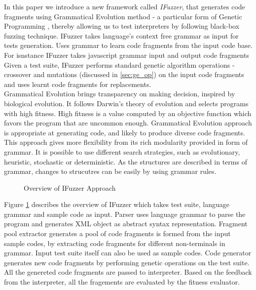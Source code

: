 \documentclass{acm_proc_article-sp}
\begin{document}
\indent In this paper we introduce a new framework called \textit{IFuzzer}, that generates code fragments using Grammatical Evolution method - a particular form of Genetic Programming \cite{Neill_10}, thereby allowing us to test interpreters by following black-box fuzzing technique. IFuzzer takes language's context free grammar as input for tests generation. Uses grammar to learn code fragments from the input code base. For isnstance IFuzzer takes javascript grammar input and output code fragments Given a test suite, IFuzzer performs standard genetic algorithm operations - crossover and mutations (discussed in \autoref{sec:ge_op}) on the input code fragments and uses learnt code fragments for replacements. \\
Grammatical Evolution brings transparency on making decision, inspired by biological evolution. It follows Darwin's theory of evolution and selects programs with high fitness. High fitness is a value computed by an objective function which favors the program that are uncommon enough. Grammatical Evolution approach is appropriate at generating code, and likely to produce diverse code fragments. 
This approach gives more flexibility from its rich modularity provided in form of grammar. It is possible to use different search strategies, such as evolutionary, heuristic, stochastic or deterministic. As the structures are described in terms of grammar, changes to strucutres can be easily by using grammar rules.
\\
\begin{figure}
\centering
{}
\caption {Overview of IFuzzer Approach}
\label{fig1}
\end{figure}
\indent  Figure \ref{fig1} describes the overview of IFuzzer which takes test suite, language grammar and sample code as input. Parser uses language grammar to parse the program and generates XML object as abstract syntax representation. Fragment pool extractor generates a pool of code fragments is formed from the input sample codes, by extracting code fragments for different non-terminals in grammar. Input test suite itself can also be used as sample codes. Code generator generates new code fragments by performing genetic operations on the test suite. All the genereted code fragments are passed to interpreter. Based on the feedback from the interpreter, all the fragements are evaluated by the fitness evaluator. 
\end{document}
